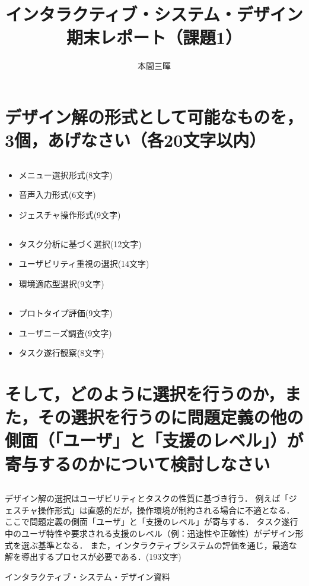 \documentclass[titlepage,a4paper]{jsarticle}
\title{インタラクティブ・システム・デザイン期末レポート（課題1）}
\author{本間三暉}
\renewcommand{\thesubsection}{\thesection-\arabic{subsection})}
\begin{document}
\maketitle

\section{デザイン解の形式として可能なものを，3個，あげなさい（各20文字以内）}
\subsection{ }
\begin{itemize}
  \item メニュー選択形式(8文字)
  \item 音声入力形式(6文字)
  \item ジェスチャ操作形式(9文字)
\end{itemize}

\subsection{ }
\begin{itemize}
  \item タスク分析に基づく選択(12文字)
  \item ユーザビリティ重視の選択(14文字)
  \item 環境適応型選択(9文字)
\end{itemize}

\subsection{ }
\begin{itemize}
  \item プロトタイプ評価(9文字)
  \item ユーザニーズ調査(9文字)
  \item タスク遂行観察(8文字)
\end{itemize}

\section{そして，どのように選択を行うのか，また，その選択を行うのに問題定義の他の側面（「ユーザ」と「支援のレベル」）が寄与するのかについて検討しなさい}
\renewcommand{\thesubsection}{\thesection)}
\subsection{ }
デザイン解の選択はユーザビリティとタスクの性質に基づき行う．
例えば「ジェスチャ操作形式」は直感的だが，操作環境が制約される場合に不適となる．
ここで問題定義の側面「ユーザ」と「支援のレベル」が寄与する．
タスク遂行中のユーザ特性や要求される支援のレベル（例：迅速性や正確性）がデザイン形式を選ぶ基準となる．
また，インタラクティブシステムの評価を通じ，最適な解を導出するプロセスが必要である．(193文字)
\begin{thebibliography}{99}
  インタラクティブ・システム・デザイン資料
\end{thebibliography}
\end{document}
